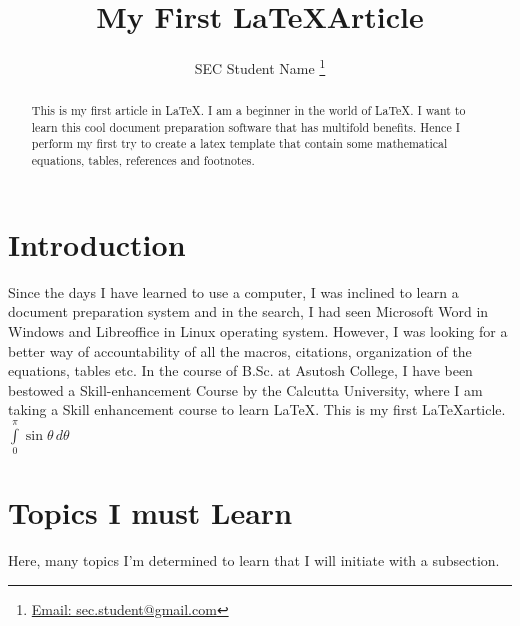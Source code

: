 \documentclass[onecolumn,12pt]{article}
\title{\bf My First \LaTeX Article}
\author{SEC Student Name \thanks{\href{mailto:sec.student@gmail.com}{Email: sec.student@gmail.com}}}
\affil{Department of Physics, Asutosh College, Kolkata 700026, India}
\begin{document}
\maketitle

\begin{abstract}
This is my first article in \LaTeX. I am a beginner in the world of \LaTeX.
I want to learn this cool document preparation software that has multifold benefits. Hence I perform my first try to create a latex template that contain some mathematical equations, tables, references and footnotes.  
\end{abstract}

\section{Introduction}
\label{intro}
Since the days I have learned to use a computer, I was inclined to learn a document preparation system and in the search, I had seen Microsoft Word in Windows and Libreoffice in Linux operating system. However, I was looking for a better way of accountability of all the macros, citations, organization of the equations, tables etc. In the course of B.Sc. at Asutosh College, I have been bestowed a Skill-enhancement Course by the Calcutta University, where I am taking a Skill enhancement course to learn \LaTeX\cite{leslam}. This is my first \LaTeX article. $\displaystyle{\int\limits_0 ^ \pi \sin \theta\, d\theta}$

\section{Topics I must Learn}
\label{sec:1}
Here, many topics I'm determined to learn that I will initiate with a subsection.
\end{document}
